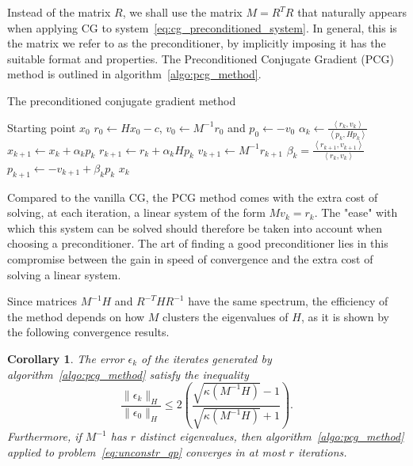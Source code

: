\documentclass[10pt]{article}
\newtheorem{corollary}[theorem]{Corollary}
\numberwithin{equation}{section}
\newcommand{\scal}[2]{\left\langle {#1} , {#2} \right\rangle} %
\begin{document}
	 Instead of the matrix $R$, we shall use the matrix $M=R^TR$ that naturally appears when applying CG to system~\eqref{eq:cg_preconditioned_system}. In general, this is the matrix we refer to as the preconditioner, by implicitly imposing it has the suitable format and properties. The Preconditioned Conjugate Gradient (PCG) method is outlined in algorithm~\ref{algo:pcg_method}.
	 
	 \begin{algorithm}
	 	\caption{The preconditioned conjugate gradient method}\label{algo:pcg_method}
	 	\begin{algorithmic}
	 		\Require Starting point $x_0$
	 		\State $r_0 \gets Hx_0-c$, $v_0\gets M^{-1}r_0$ and $p_0 \gets -v_0$
	 		\State $\alpha_k \gets \frac{\scal{r_k}{v_k}}{\scal{p_k}{Hp_k}}$
	 		\State $x_{k+1} \gets x_k+\alpha_kp_k$
	 		\State $r_{k+1} \gets r_k + \alpha_kHp_k$
	 		\State $v_{k+1}\gets M^{-1}r_{k+1}$
	 		\State $\beta_k =  \frac{\scal{r_{k+1}}{v_{k+1}}}{\scal{r_k}{v_k}}$
	 		\State $p_{k+1} \gets -v_{k+1}+\beta_kp_k$
	 		\EndFor{}
	 		\Return $x_k$
	 	\end{algorithmic}
	 \end{algorithm} 
	 
	 Compared to the vanilla CG, the PCG method comes with the extra cost of solving, at each iteration, a linear system of the form $Mv_k=r_k$. The "ease" with which this system can be solved should therefore be taken into account when choosing a preconditioner. The art of finding a good preconditioner lies in this compromise between the gain in speed of convergence and the extra cost of solving a linear system.
	 
	 Since matrices $M^{-1}H$ and $R^{-T}HR^{-1}$ have the same spectrum, the efficiency of the method depends on how $M$ clusters the eigenvalues of $H$, as it is shown by the following convergence results.
	 
	 \begin{corollary}
	 	\label{corollary:pcg_convergence}
	 	The error $\epsilon_k$ of the iterates generated by algorithm~\ref{algo:pcg_method} satisfy the inequality
	 	\begin{equation}\label{eq:pcg_error_decrease_inequality}
	 		\dfrac{\|\epsilon_k\|_H}{\|\epsilon_0\|_H} \le 2 \left(\dfrac{\sqrt{\kappa(M^{-1}H)}-1}{\sqrt{\kappa(M^{-1}H)}+1}\right).
	 	\end{equation}
	 	Furthermore, if $M^{-1}$ has $r$ distinct eigenvalues, then algorithm~\ref{algo:pcg_method} applied to problem~\eqref{eq:unconstr_qp} converges in at most $r$ iterations.
	 \end{corollary}
	 
\end{document}

